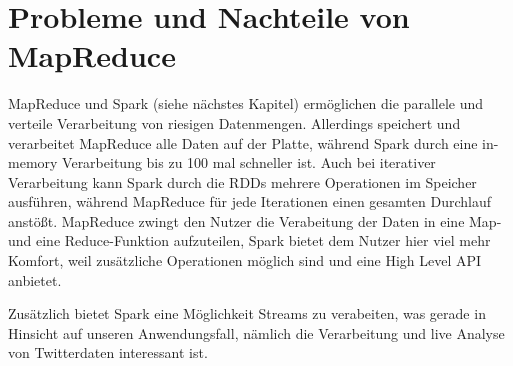 \section{Probleme und Nachteile von MapReduce}

MapReduce und Spark (siehe nächstes Kapitel) ermöglichen die parallele und verteile Verarbeitung von riesigen Datenmengen.
Allerdings speichert und verarbeitet MapReduce alle Daten auf der Platte, während Spark durch eine in-memory Verarbeitung bis zu 100 mal schneller ist.
Auch bei iterativer Verarbeitung kann Spark durch die RDDs mehrere Operationen im Speicher ausführen, 
während MapReduce für jede Iterationen einen gesamten Durchlauf anstößt.
MapReduce zwingt den Nutzer die Verabeitung der Daten in eine Map- und eine Reduce-Funktion aufzuteilen, Spark bietet dem Nutzer hier viel mehr Komfort, weil zusätzliche Operationen möglich sind und eine High Level API anbietet. 

Zusätzlich bietet Spark eine Möglichkeit Streams zu verabeiten, was gerade in Hinsicht auf unseren Anwendungsfall, nämlich die Verarbeitung und live Analyse von Twitterdaten interessant ist. 


